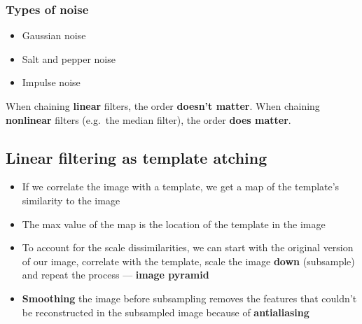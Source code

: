 \documentclass{article}
\begin{document}
            \subsubsection{Types of noise}
            \begin{itemize}
                \item Gaussian noise
                \item Salt and pepper noise
                \item Impulse noise
            \end{itemize}

            When chaining \textbf{linear} filters, the order \textbf{doesn't matter}.
            When chaining \textbf{nonlinear} filters (e.g.\ the median filter), the order \textbf{does matter}.

        \subsection{Linear filtering as template atching}
        \begin{itemize}
            \item If we correlate the image with a template, we get a map of the template's similarity to the image
            \item The max value of the map is the location of the template in the image
            \item To account for the scale dissimilarities, we can start with the original version of our image, correlate with the template, scale the image \textbf{down} (subsample) and repeat the process --- \textbf{image pyramid}
            \item \textbf{Smoothing} the image before subsampling removes the features that couldn't be reconstructed in the subsampled image because of \textbf{antialiasing}
        \end{itemize}
        
\end{document}
